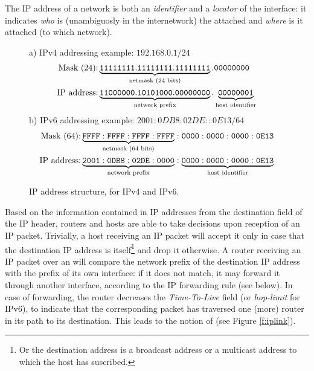 \begin{remark}
The IP address of a network  is both an {\em identifier} and a {\em locator} of the interface: it indicates {\em who} is (unambiguosly in the internetwork) the attached  and {\em where} is it attached (to which network).
\end{remark}

\begin{figure}[htb]
\centering
{\small a) IPv4 addressing example: $192.168.0.1/24$}
\begin{eqnarray*}
\textrm{Mask (24):} 		& \underbrace{{\tt 11111111}.{\tt 11111111}.{\tt 11111111}}_{\textrm{netmask (24 bits)}}.{\tt 00000000} \\
\textrm{IP address:} 	& \underbrace{{\tt 11000000}.{\tt 10101000}.{\tt 00000000}}_{\textrm{network prefix}}.\underbrace{{\tt 00000001}}_{\textrm{host identifier}}
\end{eqnarray*}
{\small b) IPv6 addressing example: $2001:0DB8:02DE::0E13/64$}
\begin{eqnarray*}
\textrm{Mask (64):} 			& \underbrace{{\tt FFFF}:{\tt FFFF}:{\tt FFFF}:{\tt FFFF}}_{\textrm{netmask (64 bits)}}:{\tt 0000}:{\tt 0000}:{\tt 0000}:{\tt 0E13} \\
\textrm{IP address:} 	& \underbrace{{\tt 2001}:{\tt 0DB8}:{\tt 02DE}:{\tt 0000}}_{\textrm{network prefix}}:\underbrace{{\tt 0000}:{\tt 0000}:{\tt 0000}:{\tt 0E13}}_{\textrm{host identifier}}
\end{eqnarray*}
\caption{IP address structure, for IPv4 and IPv6.}
\label{f:ipa}
\end{figure}
%
%
Based on the information contained in IP addresses from the destination field of the IP header, routers and hosts are able to take decisions upon reception of an IP packet. Trivially, a host receiving an IP packet will accept it only in case that the destination IP address is itself\footnote{Or the destination address is a broadcast address or a multicast address to which the host has suscribed.} and drop it otherwise. A router receiving an IP packet over an  will compare the network prefix of the destination IP address with the prefix of its own interface: if it does not match, it may forward it through another interface, according to the IP forwarding rule (see below). In case of forwarding, the router decreases the {\em Time-To-Live} field (or {\em hop-limit} for IPv6), to indicate that the corresponding packet has traversed one (more) router in its path to its destination. This leads to the notion of  (see Figure \ref{f:iplink}).
